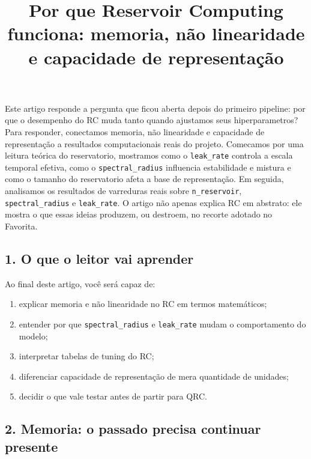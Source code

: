 \documentclass[12pt]{article}
\title{Por que Reservoir Computing funciona: memoria, não linearidade e capacidade de representação}
\author{}
\providecommand{\tightlist}{%
          \setlength{\itemsep}{0pt}\setlength{\parskip}{0pt}}
\begin{document}
        \maketitle

        \begin{resumo}
        Este artigo responde a pergunta que ficou aberta depois do primeiro pipeline: por que o desempenho do RC muda tanto quando ajustamos seus hiperparametros? Para responder, conectamos memoria, não linearidade e capacidade de representação a resultados computacionais reais do projeto. Comecamos por uma leitura teórica do reservatorio, mostramos como o \texttt{leak\_rate} controla a escala temporal efetiva, como o \texttt{spectral\_radius} influencia estabilidade e mistura e como o tamanho do reservatorio afeta a base de representação. Em seguida, analisamos os resultados de varreduras reais sobre \texttt{n\_reservoir}, \texttt{spectral\_radius} e \texttt{leak\_rate}. O artigo não apenas explica RC em abstrato: ele mostra o que essas ideias produzem, ou destroem, no recorte adotado no Favorita.
        \end{resumo}

        \subsection{1. O que o leitor vai aprender}\label{1-o-que-o-leitor-vai-aprender}

Ao final deste artigo, você será capaz de:

\begin{enumerate}
\def\labelenumi{\arabic{enumi}.}
\tightlist
\item
  explicar memoria e não linearidade no RC em termos matemáticos;
\item
  entender por que \texttt{spectral\_radius} e \texttt{leak\_rate} mudam o comportamento do modelo;
\item
  interpretar tabelas de tuning do RC;
\item
  diferenciar capacidade de representação de mera quantidade de unidades;
\item
  decidir o que vale testar antes de partir para QRC.
\end{enumerate}

\subsection{2. Memoria: o passado precisa continuar presente}\label{2-memoria-o-passado-precisa-continuar-presente}
\end{document}
